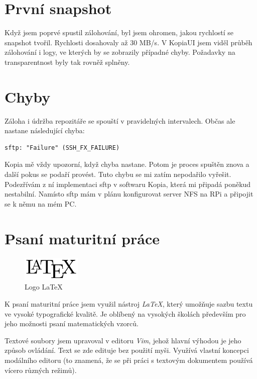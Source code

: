 \documentclass[a4paper,12pt, oneside]{book}
\begin{document}
\section{První snapshot}

Když jsem poprvé spustil zálohování, byl jsem ohromen, jakou rychlostí se 
snapshot tvořil. Rychlosti dosahovaly až 30 MB/s. V KopiaUI jsem viděl průběh
zálohování i logy, ve kterých by se zobrazily případné chyby. Požadavky 
na transparentnost byly tak rovněž splněny.

\section{Chyby}

Záloha i údržba repozitáře 
se spouští v pravidelných intervalech. Občas ale nastane následující chyba: 
\begin{lstlisting}
sftp: "Failure" (SSH_FX_FAILURE)
\end{lstlisting}

Kopia mě vždy upozorní, když chyba nastane. 
Potom je proces spuštěn znova a další pokus se podaří provést. 
Tuto chybu se mi zatím nepodařilo vyřešit. Podezřívám z ní implementaci 
sftp v softwaru Kopia, která mi připadá poněkud nestabilní. 
Namísto sftp mám v plánu konfigurovat server NFS na RPi a připojit se k němu na
mém PC.


\newpage
\section{Psaní maturitní práce}

\begin{figure}
	\centering
	\includegraphics[width=0.25\textwidth]{img/LaTeX_logo.png}
	\caption{Logo LaTeX}
\end{figure}

K psaní maturitní práce jsem využil nástroj \emph{LaTeX}, který
umožňuje sazbu textu ve vysoké typografické kvalitě. \cite{Latex-Wikipedia}  Je
oblíbený na vysokých školách především pro jeho možnosti psaní matematických
vzorců. 


Textové soubory jsem upravoval v editoru \emph{Vim}, jehož hlavní výhodou je
jeho způsob ovládání. Text se zde edituje bez
použití myši. Využívá vlastní koncepci modálního editoru (to znamená, že se při
práci s textovým dokumentem používá vícero různých režimů).
\cite{Vim-Wikipedia}
\end{document}
